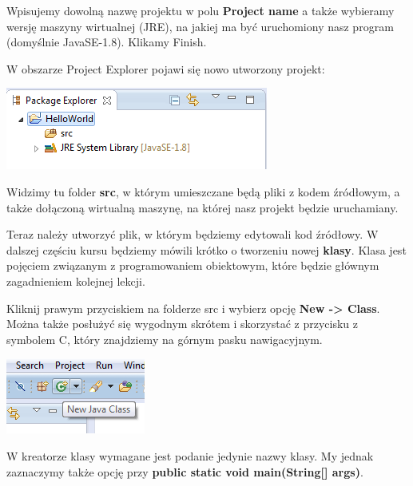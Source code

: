 \documentclass[letterpaper,10pt,english]{sphinxmanual}
\begin{document}
Wpisujemy dowolną nazwę projektu w polu \textbf{Project name} a także wybieramy wersję maszyny wirtualnej (JRE), na jakiej ma być uruchomiony nasz program (domyślnie JavaSE-1.8). Klikamy Finish.

W obszarze Project Explorer pojawi się nowo utworzony projekt:

{\hfill\includegraphics{hello_world.png}\hfill}

Widzimy tu folder \textbf{src}, w którym umieszczane będą pliki z kodem źródłowym, a także dołączoną wirtualną maszynę, na której nasz projekt będzie uruchamiany.

Teraz należy utworzyć plik, w którym będziemy edytowali kod źródłowy. W dalszej częściu kursu będziemy mówili krótko o tworzeniu nowej \textbf{klasy}. Klasa jest pojęciem związanym z programowaniem obiektowym, które będzie głównym zagadnieniem kolejnej lekcji.

Kliknij prawym przyciskiem na folderze src i wybierz opcję \textbf{New -\textgreater{} Class}. Można także posłużyć się wygodnym skrótem i skorzystać z przycisku z symbolem C, który znajdziemy na górnym pasku nawigacyjnym.

{\hfill\includegraphics{new_class.png}\hfill}

W kreatorze klasy wymagane jest podanie jedynie nazwy klasy. My jednak zaznaczymy także opcję przy \textbf{public static void main(String{[}{]} args)}.
\end{document}
